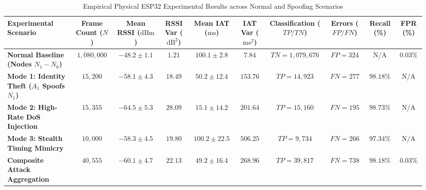 \begin{table}[htbp]
\caption{Empirical Physical ESP32 Experimental Results across Normal and Spoofing Scenarios}
\label{tab_ieee_empirical_results}
\centering
\small
\renewcommand{\arraystretch}{1.2}
\begin{tabular}{|l|c|c|c|c|c|c|c|c|c|}
\hline
\textbf{Experimental Scenario} & \textbf{Frame Count ($N$)} & \textbf{Mean RSSI ($\text{dBm}$)} & \textbf{RSSI Var ($\text{dB}^2$)} & \textbf{Mean IAT ($\text{ms}$)} & \textbf{IAT Var ($\text{ms}^2$)} & \textbf{Classification ($TP / TN$)} & \textbf{Errors ($FP / FN$)} & \textbf{Recall (\%)} & \textbf{FPR (\%)} \\
\hline
\textbf{Normal Baseline (Nodes $N_1-N_6$)} & $1,080,000$ & $-48.2 \pm 1.1$ & $1.21$ & $100.1 \pm 2.8$ & $7.84$ & $TN = 1,079,676$ & $FP = 324$ & N/A & \textbf{$0.03\%$} \\
\textbf{Mode 1: Identity Theft ($A_1$ Spoofs $N_1$)} & $15,200$ & $-58.1 \pm 4.3$ & $18.49$ & $50.2 \pm 12.4$ & $153.76$ & $TP = 14,923$ & $FN = 277$ & \textbf{$98.18\%$} & N/A \\
\textbf{Mode 2: High-Rate DoS Injection} & $15,355$ & $-64.5 \pm 5.3$ & $28.09$ & $15.1 \pm 14.2$ & $201.64$ & $TP = 15,160$ & $FN = 195$ & \textbf{$98.73\%$} & N/A \\
\textbf{Mode 3: Stealth Timing Mimicry} & $10,000$ & $-58.3 \pm 4.5$ & $19.80$ & $100.2 \pm 22.5$ & $506.25$ & $TP = 9,734$ & $FN = 266$ & \textbf{$97.34\%$} & N/A \\
\hline
\textbf{Composite Attack Aggregation} & $40,555$ & $-60.1 \pm 4.7$ & $22.13$ & $49.2 \pm 16.4$ & $268.96$ & $TP = 39,817$ & $FN = 738$ & \textbf{$98.18\%$} & \textbf{$0.03\%$} \\
\hline
\end{tabular}
\end{table}
